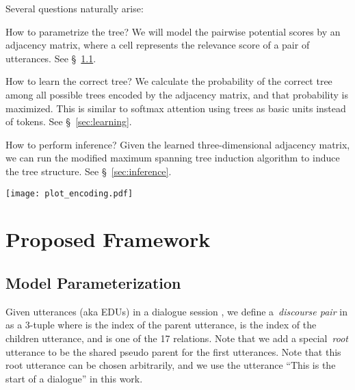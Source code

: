 \documentclass[11pt]{article}
\begin{document}
Several questions naturally arise:
\begin{compactitem}
    \item How to parametrize the tree? We will model the pairwise potential scores by an adjacency matrix, where a cell represents the relevance score of a pair of utterances. See \S~\ref{sec:parameterization}.
    \item How to learn the correct tree? We calculate the probability of the correct tree among all possible trees encoded by the adjacency matrix, and that probability is maximized. This is similar to softmax attention using trees as basic units instead of tokens. See \S~\ref{sec:learning}.
    \item How to perform inference? Given the learned three-dimensional adjacency matrix, we can run the modified maximum spanning tree induction algorithm to induce the tree structure. See \S~\ref{sec:inference}.
\end{compactitem}

\begin{figure*}[]
\vspace{-1cm}
\texttt{[image: plot\_encoding.pdf]}
\caption{The contextual encoding process. Row numbers from 0 to 4 represent , and column numbers from 1 to 5 represents . In this example, the 1-st utterance can connect to the 2-nd, 3-rd or 5-th utterances when predicting the  cell. This is represented by the orange rectangles. Similarly, the 4-th utterance can have 0, 1, or 3-rd utterances as its parent, represented by the green rectangles. We use two LSTMs for two directions (orange and green). Finally, we add the contextualized vectors together to get the purple vector .}
\label{fig:contextual_encoding}
\end{figure*}

\section{Proposed Framework}
\label{sec:framework}
\subsection{Model Parameterization}
\label{sec:parameterization}
Given  utterances (aka EDUs)  in a dialogue session , we define a~\emph{discourse pair} in  as a 3-tuple  where  is the index of the parent utterance,  is the index of the children utterance, and  is one of the 17 relations. Note that we add a special~\emph{root} utterance  to be the shared pseudo parent for the first utterances. Note that this root utterance can be chosen arbitrarily, and we use the utterance ``This is the start of a dialogue'' in this work.
\end{document}
